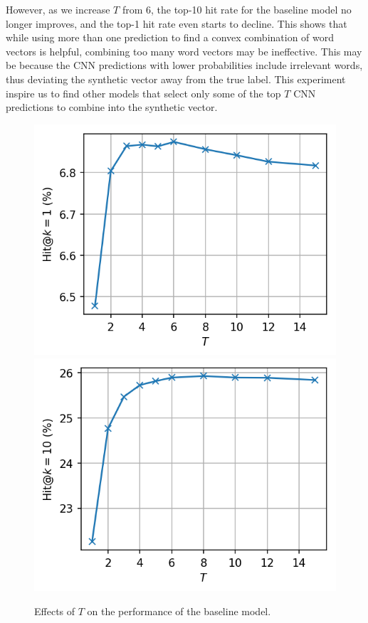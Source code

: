 \documentclass[11pt,letterpaper]{article}
\begin{document}
However, as we increase $T$ from 6, the top-10 hit rate for the baseline model no longer improves, and the top-1 hit rate even starts to decline. This shows that while using more than one prediction to find a convex combination of word vectors is helpful, combining too many word vectors may be ineffective. This may be because the CNN predictions with lower probabilities include irrelevant words, thus deviating the synthetic vector away from the true label. This experiment inspire us to find other models that select only some of the top $T$ CNN predictions to combine into the synthetic vector.

\begin{figure}[ht]
\centering
\includegraphics[width=0.48\columnwidth]{effect_tt_k1.png} \hfill
\includegraphics[width=0.48\columnwidth]{effect_tt_k10.png} 
\caption{Effects of $T$ on the performance of the baseline model.}
\label{fig:tt}
\end{figure}


\end{document}
